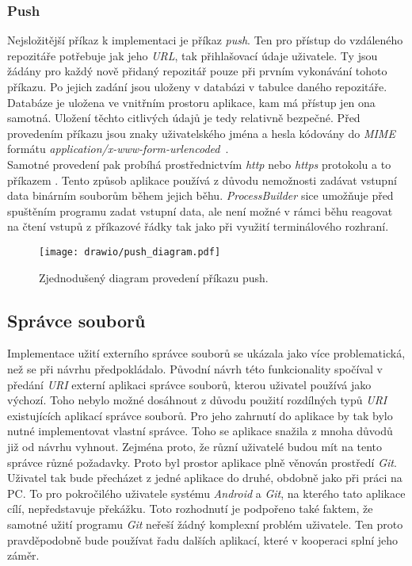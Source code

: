         \subsubsection{Push}
        Nejsložitější příkaz k implementaci je příkaz \emph{push}. Ten pro přístup do vzdáleného repozitáře potřebuje jak jeho \emph{URL}, tak přihlašovací údaje uživatele. Ty jsou žádány pro každý nově přidaný repozitář pouze při prvním vykonávání tohoto příkazu. Po jejich zadání jsou uloženy v databázi v tabulce daného repozitáře. Databáze je uložena ve vnitřním prostoru aplikace, kam má přístup jen ona samotná. Uložení těchto citlivých údajů je tedy relativně bezpečné. Před provedením příkazu jsou znaky uživatelského jména a hesla kódovány do \emph{MIME} formátu \emph{application/x-www-form-urlencoded}~.\\ Samotné provedení pak probíhá prostřednictvím \emph{http} nebo \emph{https} protokolu a to příkazem .
        Tento způsob aplikace používá z důvodu nemožnosti zadávat vstupní data binárním souborům během jejich běhu. \emph{ProcessBuilder} sice umožňuje před spuštěním programu zadat vstupní data, ale není možné v rámci běhu reagovat na čtení vstupů z příkazové řádky tak jako při využití terminálového rozhraní.

        \newpage
        \begin{figure}[h]
            \centering
            \vspace{0.5cm}
            \texttt{[image: drawio/push\_diagram.pdf]}
            \caption[Diagram provedení příkazu push]{Zjednodušený diagram provedení příkazu push.}
            \label{diagram:push}
        \end{figure}
    
    \subsection{Správce souborů}
    Implementace užití externího správce souborů se ukázala jako více problematická, než se při návrhu předpokládalo. Původní návrh této funkcionality spočíval v předání \emph{URI} externí aplikaci správce souborů, kterou uživatel používá jako výchozí. Toho nebylo možné dosáhnout z důvodu použití rozdílných typů \emph{URI} existujících aplikací správce souborů. Pro jeho zahrnutí do aplikace by tak bylo nutné implementovat vlastní správce. Toho se aplikace snažila z mnoha důvodů již od návrhu vyhnout. Zejména proto, že různí uživatelé budou mít na tento správce různé požadavky. Proto byl prostor aplikace plně věnován prostředí \emph{Git}. Uživatel tak bude přecházet z jedné aplikace do druhé, obdobně jako při práci na PC. To pro pokročilého uživatele systému \emph{Android} a \emph{Git}, na kterého tato aplikace cílí, nepředstavuje překážku.
    Toto rozhodnutí je podpořeno také faktem, že samotné užití programu \emph{Git} neřeší žádný komplexní problém uživatele. Ten proto pravděpodobně bude používat řadu dalších aplikací, které v kooperaci splní jeho záměr.


